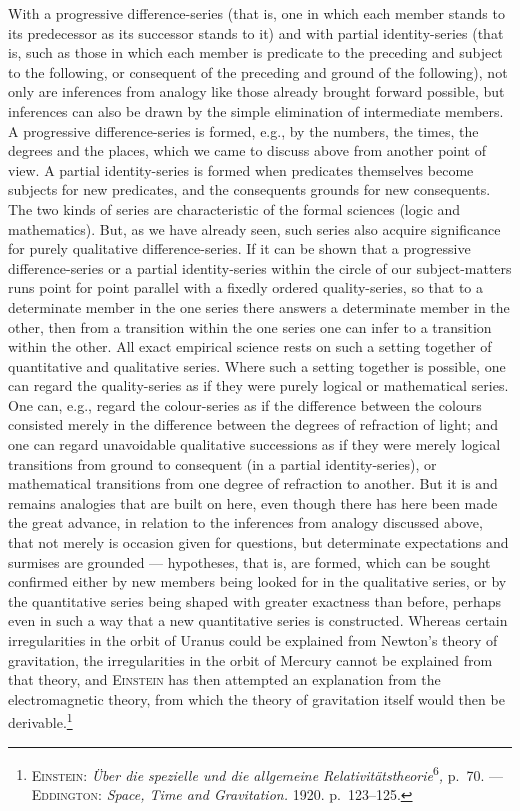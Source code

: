\documentclass[12pt]{book}
\newcommand{\opage}[1]{\marginnote{\footnotesize\textit{[#1]}}}
\begin{document}
With a progressive difference-series (that is, one in which each member stands to
its predecessor as its successor stands to it) and with partial identity-series
(that is, such as those in which each member is predicate to the preceding and
subject to the following, or consequent of the preceding and ground of the
following), not only are inferences from analogy like those already brought
forward possible, but inferences can also be drawn by the simple elimination of
intermediate members. A progressive difference-series is formed, e.g., by the
numbers, the times, the degrees and the places, which we came to discuss above
from another point of view. A partial identity-series is formed when predicates
themselves become subjects for new predicates, and the consequents grounds for
new consequents. The two kinds of series are characteristic of the formal
sciences (logic and mathematics). But, as we have already seen, such series also
acquire significance for purely qualitative difference-series. If it can be shown
that a progressive difference-series or a partial identity-series within the
circle of our subject-matters runs point for point parallel with a fixedly
ordered quality-series, so that to a determinate member in the one series there
answers a determinate member in the other, then from a transition within the one
series one can infer to a transition within \opage{59}the other. All exact empirical
science rests on such a setting together of quantitative and qualitative series.
Where such a setting together is possible, one can regard the quality-series as
if they were purely logical or mathematical series. One can, e.g., regard the
colour-series as if the difference between the colours consisted merely in the
difference between the degrees of refraction of light; and one can regard
unavoidable qualitative successions as if they were merely logical transitions
from ground to consequent (in a partial identity-series), or mathematical
transitions from one degree of refraction to another. But it is and remains
analogies that are built on here, even though there has here been made the great
advance, in relation to the inferences from analogy discussed above, that not
merely is occasion given for questions, but determinate expectations and surmises
are grounded --- hypotheses, that is, are formed, which can be sought confirmed
either by new members being looked for in the qualitative series, or by the
quantitative series being shaped with greater exactness than before, perhaps even
in such a way that a new quantitative series is constructed. Whereas certain
irregularities in the orbit of Uranus could be explained from Newton's theory of
gravitation, the irregularities in the orbit of Mercury cannot be explained from
that theory, and \textsc{Einstein} has then attempted an explanation from the
electromagnetic theory, from which the theory of gravitation itself would then be
derivable.\footnote{\textsc{Einstein:} \textit{Über die spezielle und die
allgemeine Relativitätstheorie}\textsuperscript{6}\textit{,} p.\ 70. ---
\textsc{Eddington:} \textit{Space, Time and Gravitation.} 1920. p.\ 123--125.}
\end{document}
